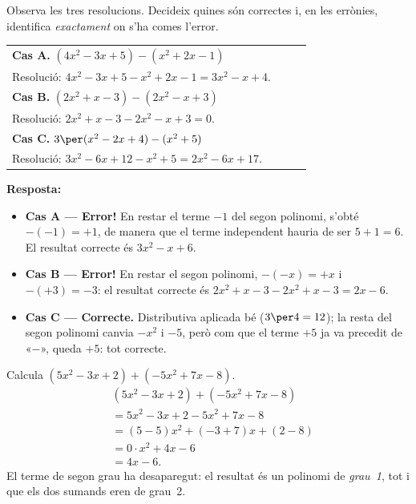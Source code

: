 \begin{exemple}
Observa les tres resolucions. Decideix quines són correctes i, en les
errònies, identifica \emph{exactament} on s'ha comes l'error.

\medskip
\begin{tabular}{@{}p{0.90\linewidth}@{}}
\textbf{Cas A.} $(4x^2 - 3x + 5) - (x^2 + 2x - 1)$ \\
\quad Resolució: $4x^2-3x+5-x^2+2x-1 = 3x^2-x+4$. \\[5pt]
\textbf{Cas B.} $(2x^2 + x - 3) - (2x^2 - x + 3)$ \\
\quad Resolució: $2x^2+x-3-2x^2-x+3 = 0$. \\[5pt]
\textbf{Cas C.} $3\per(x^2 - 2x + 4) - (x^2 + 5)$ \\
\quad Resolució: $3x^2-6x+12-x^2+5 = 2x^2-6x+17$.
\end{tabular}

\medskip
\textbf{Resposta:}
\begin{itemize}[leftmargin=1.4em, itemsep=2pt]
  \item \textbf{Cas A — Error!} En restar el terme $-1$ del segon polinomi,
        s'obté $-(-1)=+1$, de manera que el terme independent hauria de
        ser $5+1=6$. El resultat correcte és $3x^2-x+6$.
  \item \textbf{Cas B — Error!} En restar el segon polinomi, $-(-x)=+x$ i
        $-(+3)=-3$: el resultat correcte és $2x^2+x-3-2x^2+x-3=2x-6$.
  \item \textbf{Cas C — Correcte.} Distributiva aplicada bé ($3\per 4=12$);
        la resta del segon polinomi canvia $-x^2$ i $-5$, però com que el
        terme $+5$ ja va precedit de «$-$», queda $+5$: tot correcte.
\end{itemize}
\end{exemple}

\begin{exemple}
Calcula $(5x^2 - 3x + 2) + (-5x^2 + 7x - 8)$.
\begin{align*}
&(5x^2-3x+2)+(-5x^2+7x-8) \\
&= 5x^2-3x+2-5x^2+7x-8 \\
&= (5-5)x^2 + (-3+7)x + (2-8) \\
&= 0 \cdot x^2 + 4x - 6 \\
&= 4x - 6.
\end{align*}
El terme de segon grau ha desaparegut: el resultat és un polinomi de
\emph{grau~1}, tot i que els dos sumands eren de grau~2.
\end{exemple}

